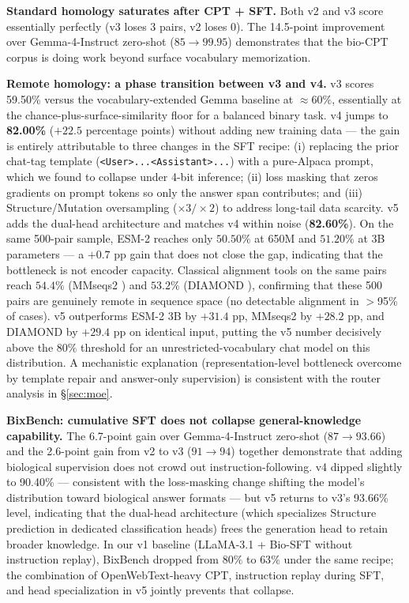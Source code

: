 \documentclass[11pt]{article}
\begin{document}
\textbf{Standard homology saturates after CPT + SFT.} Both v2 and v3 score essentially perfectly (v3 loses 3 pairs, v2 loses 0). The 14.5-point improvement over Gemma-4-Instruct zero-shot ($85 \to 99.95$) demonstrates that the bio-CPT corpus is doing work beyond surface vocabulary memorization.

\textbf{Remote homology: a phase transition between v3 and v4.} v3 scores 59.50\% versus the vocabulary-extended Gemma baseline at $\approx 60\%$, essentially at the chance-plus-surface-similarity floor for a balanced binary task. v4 jumps to \textbf{82.00\%} ($+22.5$ percentage points) without adding new training data --- the gain is entirely attributable to three changes in the SFT recipe: (i) replacing the prior chat-tag template (\texttt{<User>...<Assistant>...}) with a pure-Alpaca prompt, which we found to collapse under 4-bit inference; (ii) loss masking that zeros gradients on prompt tokens so only the answer span contributes; and (iii) Structure/Mutation oversampling ($\times 3 / \times 2$) to address long-tail data scarcity. v5 adds the dual-head architecture and matches v4 within noise (\textbf{82.60\%}). On the same 500-pair sample, ESM-2 \citep{lin2023evolutionary} reaches only $50.50\%$ at 650M and $51.20\%$ at 3B parameters --- a $+0.7$ pp gain that does not close the gap, indicating that the bottleneck is not encoder capacity. Classical alignment tools on the same pairs reach $54.4\%$ (MMseqs2 \citep{steinegger2017mmseqs2}) and $53.2\%$ (DIAMOND \citep{buchfink2021diamond}), confirming that these 500 pairs are genuinely remote in sequence space (no detectable alignment in $>$95\% of cases). v5 outperforms ESM-2 3B by $+31.4$ pp, MMseqs2 by $+28.2$ pp, and DIAMOND by $+29.4$ pp on identical input, putting the v5 number decisively above the $80\%$ threshold for an unrestricted-vocabulary chat model on this distribution. A mechanistic explanation (representation-level bottleneck overcome by template repair and answer-only supervision) is consistent with the router analysis in \S\ref{sec:moe}.

\textbf{BixBench: cumulative SFT does not collapse general-knowledge capability.} The 6.7-point gain over Gemma-4-Instruct zero-shot ($87 \to 93.66$) and the 2.6-point gain from v2 to v3 ($91 \to 94$) together demonstrate that adding biological supervision does not crowd out instruction-following. v4 dipped slightly to 90.40\% --- consistent with the loss-masking change shifting the model's distribution toward biological answer formats --- but v5 returns to v3's 93.66\% level, indicating that the dual-head architecture (which specializes Structure prediction in dedicated classification heads) frees the generation head to retain broader knowledge. In our v1 baseline (LLaMA-3.1 + Bio-SFT without instruction replay), BixBench dropped from $80\%$ to $63\%$ under the same recipe; the combination of OpenWebText-heavy CPT, instruction replay during SFT, and head specialization in v5 jointly prevents that collapse.
\end{document}
